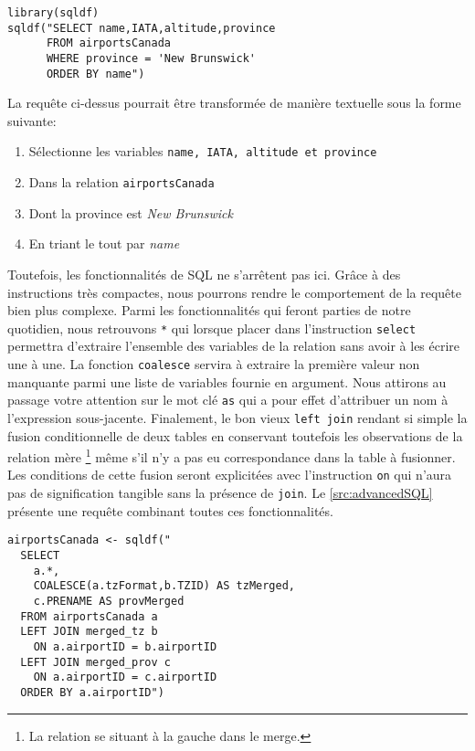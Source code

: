 \begin{lstlisting}[caption = Exemple de requête SQL,label=src:simpleSQL]
library(sqldf)
sqldf("SELECT name,IATA,altitude,province
      FROM airportsCanada
      WHERE province = 'New Brunswick'
      ORDER BY name")
\end{lstlisting}

\vspace{\baselineskip}
La requête ci-dessus pourrait être transformée de manière textuelle sous la forme suivante:
\begin{enumerate}
	\item Sélectionne les variables \texttt{name, IATA, altitude et province}
	\item Dans la relation \texttt{airportsCanada}
	\item Dont la province est \emph{New Brunswick}
	\item En triant le tout par \emph{name}
\end{enumerate}

Toutefois, les fonctionnalités de SQL ne s'arrêtent pas ici. Grâce à des instructions très compactes, nous pourrons rendre le comportement de la requête bien plus complexe. Parmi les fonctionnalités qui feront parties de notre quotidien, nous retrouvons \texttt{*} qui lorsque placer dans l'instruction \texttt{select} permettra d'extraire l'ensemble des variables de la relation sans avoir à les écrire une à une. La fonction \texttt{coalesce} servira à extraire la première valeur non manquante parmi une liste de variables fournie en argument. Nous attirons au passage votre attention sur le mot clé \texttt{as} qui a pour effet d'attribuer un nom à l'expression sous-jacente. Finalement, le bon vieux \texttt{left join} rendant si simple la fusion conditionnelle de deux tables en conservant toutefois les observations de la relation mère \footnote{La relation se situant à la gauche dans le merge.} même s'il n'y a pas eu correspondance dans la table à fusionner. Les conditions de cette fusion seront explicitées avec l'instruction \texttt{on} qui n'aura pas de signification tangible sans la présence de \texttt{join}. Le \autoref{src:advancedSQL} présente une requête combinant toutes ces fonctionnalités.

\begin{lstlisting}[caption = Fonctionnalités avancées de SQL,label=src:advancedSQL]
airportsCanada <- sqldf("
  SELECT 
    a.*, 
    COALESCE(a.tzFormat,b.TZID) AS tzMerged,
    c.PRENAME AS provMerged
  FROM airportsCanada a 
  LEFT JOIN merged_tz b
  	ON a.airportID = b.airportID
  LEFT JOIN merged_prov c
  	ON a.airportID = c.airportID
  ORDER BY a.airportID")
\end{lstlisting}

